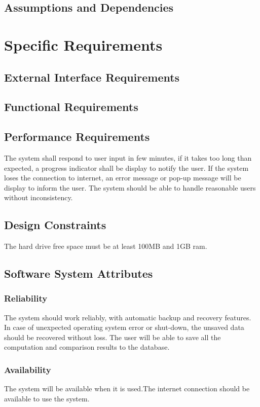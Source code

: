 \documentclass[a4paper,12pt]{article}
\begin{document}
\subsection{Assumptions and Dependencies}

\section{Specific Requirements}

\subsection{External Interface Requirements}

\subsection{Functional Requirements}

\subsection{Performance Requirements}
The system shall respond to user input in few minutes, if it takes too long than expected, a progress indicator shall be display to notify the user.
If the system loses the connection to internet, an error message or pop-up message will be display to inform the user.
The system should be able to handle reasonable users without inconsistency.
\subsection{Design Constraints}
The hard drive free space must be at least 100MB and 1GB ram.
\subsection{Software System Attributes}
\subsubsection{Reliability}
The system should work reliably, with automatic backup and recovery features. In case of unexpected operating system error or shut-down, the unsaved data should be recovered without loss. The user will be able to save all the computation and comparison results to the database.
\subsubsection{Availability}
The system will be available when it is used.The internet connection should be available to use the system.
\end{document}
